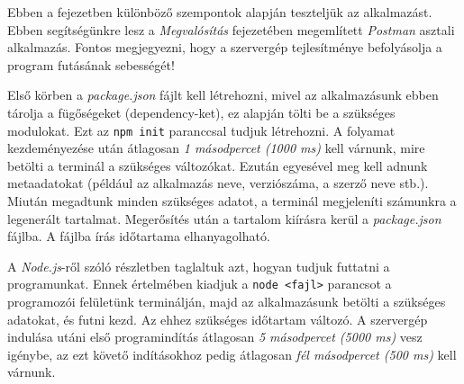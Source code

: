 
Ebben a fejezetben különböző szempontok alapján teszteljük az alkalmazást. Ebben segítségünkre lesz a \textit{Megvalósítás} fejezetében megemlített \textit{Postman} asztali alkalmazás. Fontos megjegyezni, hogy a szervergép tejlesítménye befolyásolja a program futásának sebességét!



Első körben a \textit{package.json} fájlt kell létrehozni, mivel az alkalmazásunk ebben tárolja a fügőségeket (dependency-ket), ez alapján tölti be a szükséges modulokat. Ezt az \texttt{npm init} paranccsal tudjuk létrehozni. A folyamat kezdeményezése után átlagosan \textit{1 másodpercet (1000 ms)} kell várnunk, mire betölti a terminál a szükséges változókat. Ezután egyesével meg kell adnunk metaadatokat (például az alkalmazás neve, verziószáma, a szerző neve stb.). Miután megadtunk minden szükséges adatot, a terminál megjeleníti számunkra a legenerált tartalmat. Megerősítés után a tartalom kiírásra kerül a \textit{package.json} fájlba. A fájlba írás időtartama elhanyagolható.

A \textit{Node.js}-ről szóló részletben taglaltuk azt, hogyan tudjuk futtatni a programunkat. Ennek értelmében kiadjuk a \texttt{node <fajl>} parancsot a programozói felületünk terminálján, majd az alkalmazásunk betölti a szükséges adatokat, és futni kezd. Az ehhez szükséges időtartam változó. A szervergép indulása utáni első programindítás átlagosan \textit{5 másodpercet (5000 ms)} vesz igénybe, az ezt követő indításokhoz pedig átlagosan \textit{fél másodpercet (500 ms)} kell várnunk.




